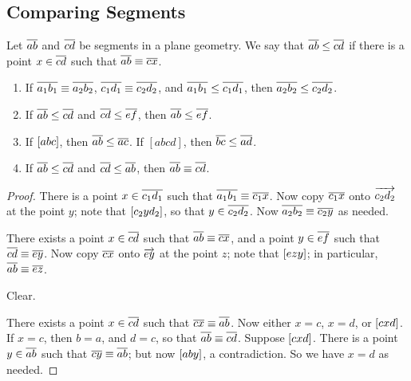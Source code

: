 \subsection*{Comparing Segments}

\begin{dfn}
Let \(\overline{ab}\) and \(\overline{cd}\) be segments in a plane geometry.
We say that \(\overline{ab} \leq \overline{cd}\) if there is a point \(x \in \overline{cd}\) such that \(\overline{ab} \equiv \overline{cx}\).
\end{dfn}

\begin{prop} \mbox{}
\begin{enumerate}
\item If \(\overline{a_1b_1} \equiv \overline{a_2b_2}\), \(\overline{c_1d_1} \equiv \overline{c_2d_2}\), and \(\overline{a_1b_1} \leq \overline{c_1d_1}\), then \(\overline{a_2b_2} \leq \overline{c_2d_2}\).
\item If \(\overline{ab} \leq \overline{cd}\) and \(\overline{cd} \leq \overline{ef}\), then \(\overline{ab} \leq \overline{ef}\).
\item If \([ a b c ]\), then \(\overline{ab} \leq \overline{ac}\).
If \([abcd]\), then \(\overline{bc} \leq \overline{ad}\).
\item If \(\overline{ab} \leq \overline{cd}\) and \(\overline{cd} \leq \overline{ab}\), then \(\overline{ab} \equiv \overline{cd}\).
\end{enumerate}
\end{prop}

\begin{proof}
\item There is a point \(x \in \overline{c_1d_1}\) such that \(\overline{a_1b_1} \equiv \overline{c_1x}\).
Now copy \(\overline{c_1x}\) onto \(\overrightarrow{c_2d_2}\) at the point \(y\); note that \([ c_2 y d_2 ]\), so that \(y \in \overline{c_2d_2}\).
Now \(\overline{a_2b_2} \equiv \overline{c_2y}\) as needed.

\item There exists a point \(x \in \overline{cd}\) such that \(\overline{ab} \equiv \overline{cx}\), and a point \(y \in \overline{ef}\) such that \(\overline{cd} \equiv \overline{ey}\).
Now copy \(\overline{cx}\) onto \(\overrightarrow{ey}\) at the point \(z\); note that \([ e z y ]\); in particular, \(\overline{ab} \equiv \overline{ez}\).

\item Clear.

\item There exists a point \(x \in \overline{cd}\) such that \(\overline{cx} \equiv \overline{ab}\).
Now either \(x = c\), \(x = d\), or \([ c x d ]\).
If \(x = c\), then \(b = a\), and \(d = c\), so that \(\overline{ab} \equiv \overline{cd}\).
Suppose \([ c x d ]\).
There is a point \(y \in \overline{ab}\) such that \(\overline{cy} \equiv \overline{ab}\); but now \([ a b y ]\), a contradiction.
So we have \(x = d\) as needed.
\end{proof}
